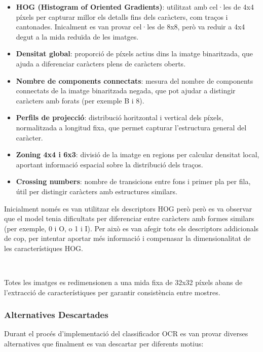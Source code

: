 \begin{itemize}
    \item \textbf{HOG (Histogram of Oriented Gradients)}: utilitzat amb cel·les de 4x4 píxels per capturar millor els detalls fins dels caràcters, com traços i cantonades. Inicalment es van provar cel·les de 8x8, però va reduir a 4x4 degut a la mida reduïda de les imatges.
    
    \item \textbf{Densitat global}: proporció de píxels actius dins la imatge binaritzada, que ajuda a diferenciar caràcters plens de caràcters oberts. 
    
    \item \textbf{Nombre de components connectats}: mesura del nombre de components connectats de la imatge binaritzada negada, que pot ajudar a distingir caràcters amb forats (per exemple B i 8).  
    \item \textbf{Perfils de projecció}: distribució horitzontal i vertical dels píxels, normalitzada a longitud fixa, que permet capturar l'estructura general del caràcter.
    
    \item \textbf{Zoning 4x4 i 6x3}: divisió de la imatge en regions per calcular densitat local, aportant informació espacial sobre la distribució dels traços.
    
    \item \textbf{Crossing numbers}: nombre de transicions entre fons i primer pla per fila, útil per distingir caràcters amb estructures similars.
\end{itemize}

Inicialment només es van utilitzar els descriptors HOG però però es va observar que el model tenia dificultats per diferenciar entre caràcters amb formes similars (per exemple, 0 i O, o 1 i I). Per això es van afegir tots els descriptors addicionals de cop, per intentar aportar més informació i compenasar la dimensionalitat de les característiques HOG.

\

Totes les imatges es redimensionen a una mida fixa de 32x32 píxels abans de l'extracció de característiques per garantir consistència entre mostres.

\subsubsection{Alternatives Descartades}

Durant el procés d'implementació del classificador OCR es van provar diverses alternatives que finalment es van descartar per diferents motius:

